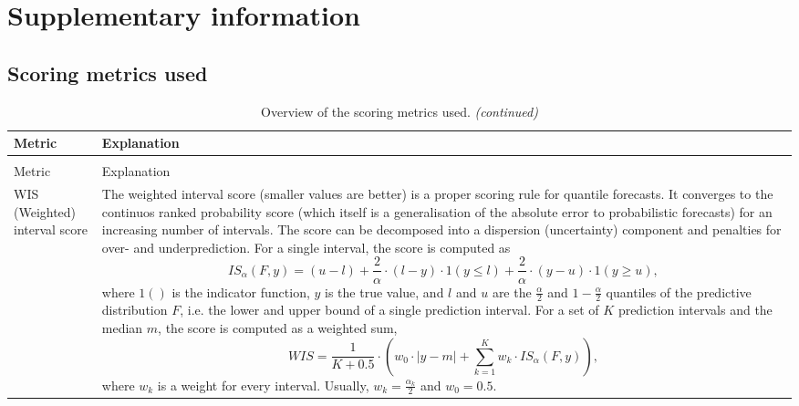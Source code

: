 \documentclass[
]{article}
\begin{document}
\clearpage

\hypertarget{appendix-supplementary-information}{%
\appendix}


\hypertarget{supplementary-information}{%
\section{Supplementary information}\label{supplementary-information}}

\hypertarget{scoring-metrics-used}{%
\subsection{Scoring metrics used}\label{scoring-metrics-used}}

\begin{longtable}[t]{>{\raggedright\arraybackslash}p{2.5cm}>{\raggedright\arraybackslash}p{13.0cm}}
\caption{\label{tab:scoring-metrics}Overview of the scoring metrics used.}\\
\toprule
Metric & Explanation\\
\midrule
\endfirsthead
\caption[]{\label{tab:scoring-metrics}Overview of the scoring metrics used. \textit{(continued)}}\\
\toprule
Metric & Explanation\\
\midrule
\endhead

\endfoot
\bottomrule
\endlastfoot
WIS (Weighted) interval score & The weighted interval score (smaller values are better) is a proper scoring rule for quantile forecasts. It converges to the continuos ranked probability score (which itself is a generalisation of the absolute error to probabilistic forecasts) for an increasing number of intervals. The score can be decomposed into a dispersion (uncertainty) component and penalties for over- and underprediction. For a single interval, the score is computed as 
  $$IS_\alpha(F,y) = (u-l) + \frac{2}{\alpha} \cdot (l-y) \cdot 1(y \leq l) + \frac{2}{\alpha} \cdot (y-u) \cdot 1(y \geq u), $$ 
  where $1()$ is the indicator function, $y$ is the true value, and $l$ and $u$ are the $\frac{\alpha}{2}$ and $1 - \frac{\alpha}{2}$ quantiles of the predictive distribution $F$, i.e. the lower and upper bound of a single prediction interval. For a set of $K$ prediction intervals and the median $m$, the score is computed as a weighted sum, 
  $$WIS = \frac{1}{K + 0.5} \cdot \left( w_0 \cdot |y - m| + \sum_{k = 1}^{K} w_k \cdot IS_{\alpha}(F, y) \right), $$
  where $w_k$ is a weight for every interval. Usually, $w_k = \frac{\alpha_k}{2}$ and $w_0 = 0.5$. 


\end{longtable}
\end{document}
